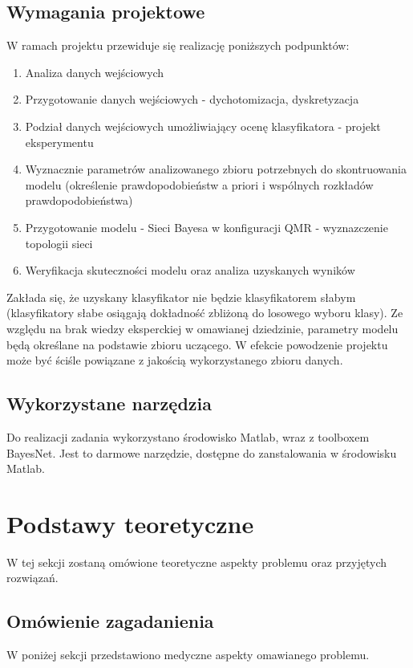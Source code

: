 \documentclass{article}
\begin{document}
\subsection{Wymagania projektowe}
W ramach projektu przewiduje się realizację poniższych podpunktów:
\begin{enumerate}
	\item Analiza danych wejściowych
	\item Przygotowanie danych wejściowych - dychotomizacja, dyskretyzacja
	\item Podział danych wejściowych umożliwiający ocenę klasyfikatora - projekt eksperymentu
	\item Wyznacznie parametrów analizowanego zbioru potrzebnych do skontruowania modelu (określenie prawdopodobieństw a priori i wspólnych rozkładów prawdopodobieństwa)
	\item Przygotowanie modelu - Sieci Bayesa w konfiguracji QMR - wyznazczenie topologii sieci
	\item Weryfikacja skuteczności modelu oraz analiza uzyskanych wyników
\end{enumerate}

Zakłada się, że uzyskany klasyfikator nie będzie klasyfikatorem słabym (klasyfikatory słabe osiągają dokładność zbliżoną do losowego wyboru klasy). Ze względu na brak wiedzy eksperckiej w omawianej dziedzinie, parametry modelu będą określane na podstawie zbioru uczącego. W efekcie powodzenie projektu może być ściśle powiązane z jakością wykorzystanego zbioru danych. 

\subsection{Wykorzystane narzędzia}
Do realizacji zadania wykorzystano środowisko Matlab, wraz z toolboxem BayesNet. Jest to darmowe narzędzie, dostępne do zanstalowania w środowisku Matlab. 

\section{Podstawy teoretyczne}
W tej sekcji zostaną omówione teoretyczne aspekty problemu oraz przyjętych rozwiązań.

\subsection{Omówienie zagadanienia}
W poniżej sekcji przedstawiono medyczne aspekty omawianego problemu.
\end{document}
